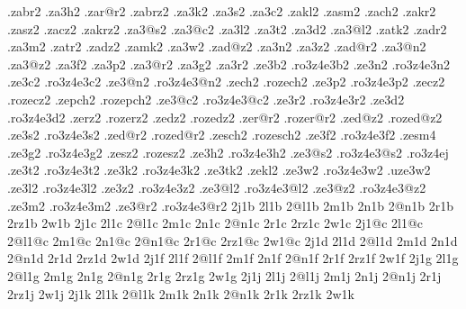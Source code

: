 {  .zabr2                        .za3h2                        .zar@r2
  .zabrz2                       .za3k2                        .za3s2
  .za3c2                        .zakl2                        .zasm2
  .zach2                        .zakr2                        .zasz2
  .zacz2                        .zakrz2                       .za3@s2
  .za3@c2                       .za3l2                        .za3t2
  .za3d2                        .za3@l2                       .zatk2
  .zadr2                        .za3m2                        .zatr2
  .zadz2                        .zamk2                        .za3w2
  .zad@z2                       .za3n2                        .za3z2
  .zad@r2                       .za3@n2                       .za3@z2
  .za3f2                        .za3p2                        .za3@r2
  .za3g2                        .za3r2  
%
%
  .ze3b2    .ro3z4e3b2                    .ze3n2    .ro3z4e3n2
  .ze3c2    .ro3z4e3c2                    .ze3@n2   .ro3z4e3@n2
  .zech2    .rozech2                      .ze3p2    .ro3z4e3p2
  .zecz2    .rozecz2                      .zepch2   .rozepch2
  .ze3@c2   .ro3z4e3@c2                   .ze3r2    .ro3z4e3r2
  .ze3d2    .ro3z4e3d2                    .zerz2    .rozerz2
  .zedz2    .rozedz2                      .zer@r2   .rozer@r2
  .zed@z2   .rozed@z2                     .ze3s2    .ro3z4e3s2
  .zed@r2   .rozed@r2                     .zesch2   .rozesch2
  .ze3f2    .ro3z4e3f2                    .zesm4  
  .ze3g2    .ro3z4e3g2                    .zesz2    .rozesz2
  .ze3h2    .ro3z4e3h2                    .ze3@s2   .ro3z4e3@s2   
            .ro3z4ej                      .ze3t2    .ro3z4e3t2
  .ze3k2    .ro3z4e3k2                    .ze3tk2   
  .zekl2                                  .ze3w2    .ro3z4e3w2     .uze3w2
  .ze3l2    .ro3z4e3l2                    .ze3z2    .ro3z4e3z2
  .ze3@l2   .ro3z4e3@l2                   .ze3@z2   .ro3z4e3@z2
  .ze3m2    .ro3z4e3m2                    .ze3@r2   .ro3z4e3@r2
%
%
  2j1b    2l1b    2@l1b    2m1b    2n1b    2@n1b    2r1b    2rz1b    2w1b
  2j1c    2l1c    2@l1c    2m1c    2n1c    2@n1c    2r1c    2rz1c    2w1c  
  2j1@c   2l1@c   2@l1@c   2m1@c   2n1@c   2@n1@c   2r1@c   2rz1@c   2w1@c
  2j1d    2l1d    2@l1d    2m1d    2n1d    2@n1d    2r1d    2rz1d    2w1d
  2j1f    2l1f    2@l1f    2m1f    2n1f    2@n1f    2r1f    2rz1f    2w1f
  2j1g    2l1g    2@l1g    2m1g    2n1g    2@n1g    2r1g    2rz1g    2w1g
  2j1j    2l1j    2@l1j    2m1j    2n1j    2@n1j    2r1j    2rz1j    2w1j    
  2j1k    2l1k    2@l1k    2m1k    2n1k    2@n1k    2r1k    2rz1k    2w1k
}

